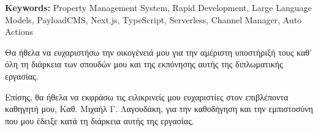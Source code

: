 \documentclass[
	12pt, %
	oneside, %
	greek,
	onehalfspacing, %
	liststotoc, %
	toctotoc, %
	parskip, %
	headsepline, %
]{MastersDoctoralThesis} %
\renewcommand{\acknowledgementname}{Πρόλογος}%
\begin{document}
\vspace{1cm}
\noindent\textbf{Keywords:} Property Management System, Rapid Development, Large Language Models, PayloadCMS, Next.js, TypeScript, Serverless, Channel Manager, Auto Actions

\vfill\null


\begin{acknowledgements}
	\addchaptertocentry{\acknowledgementname} %
	Θα ήθελα να ευχαριστήσω την οικογένειά μου για την αμέριστη υποστήριξή τους καθ' όλη τη διάρκεια των σπουδών μου και της εκπόνησης αυτής της διπλωματικής εργασίας.
	
	Επίσης, θα ήθελα να εκφράσω τις ειλικρινείς μου ευχαριστίες στον επιβλέποντα καθηγητή μου, Καθ. Μιχαήλ Γ. Λαγουδάκη, για την καθοδήγηση και την εμπιστοσύνη που μου έδειξε κατά τη διάρκεια αυτής της εργασίας.
\end{acknowledgements}


\tableofcontents %
\listoffigures %
\listoftables %

\end{document}
